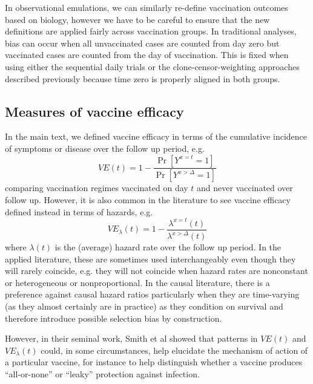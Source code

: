 \begin{appendix}
    In observational emulations, we can similarly re-define vaccination outcomes based on biology, however we have to be careful to ensure that the new definitions are applied fairly across vaccination groups. In traditional analyses, bias can occur when all unvaccinated cases are counted from day zero but vaccinated cases are counted from the day of vaccination. This is fixed when using either the sequential daily trials or the clone-censor-weighting approaches described previously because time zero is properly aligned in both groups.

    \subsection{Measures of vaccine efficacy} \label{sec:effect_measures}
    In the main text, we defined vaccine efficacy in terms of the cumulative incidence of symptoms or disease over the follow up period, e.g.
    $$
    VE(t) = 1 - \frac{\Pr[Y^{x=t} = 1]}{\Pr[Y^{x > \Delta} = 1]}
    $$ 
    comparing vaccination regimes vaccinated on day $t$ and never vaccinated over follow up. However, it is also common in the literature to see vaccine efficacy defined instead in terms of hazards, e.g.
    $$
    VE_\lambda(t) = 1 - \frac{\lambda^{x=t}(t)}{\lambda^{x > \Delta}(t)}
    $$ 
    where $\lambda(t)$ is the (average) hazard rate over the follow up period. In the applied literature, these are sometimes used interchangeably even though they will rarely coincide, e.g. they will not coincide when hazard rates are nonconstant or heterogeneous or nonproportional. In the causal literature, there is a preference against causal hazard ratios particularly when they are time-varying (as they almost certainly are in practice) as they condition on survival and therefore introduce possible selection bias by construction. 

    However, in their seminal work, Smith et al showed that patterns in $VE(t)$ and $VE_\lambda(t)$ could, in some circumstances, help elucidate the mechanism of action of a particular vaccine, for instance to help distinguish whether a vaccine produces ``all-or-none'' or ``leaky'' protection against infection. 


\end{appendix}
